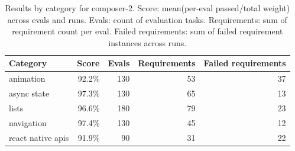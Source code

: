 \begin{table}[htbp]
\centering
\begin{tabular}{lrrrr}
\toprule
Category & Score & Evals & Requirements & Failed requirements \\
\midrule
animation & 92.2\% & 130 & 53 & 37 \\
async state & 97.3\% & 130 & 65 & 13 \\
lists & 96.6\% & 180 & 79 & 23 \\
navigation & 97.4\% & 130 & 45 & 12 \\
react native apis & 91.9\% & 90 & 31 & 22 \\
\bottomrule
\end{tabular}
\caption{Results by category for composer-2. Score: mean(per-eval passed/total weight) across evals and runs. Evals: count of evaluation tasks. Requirements: sum of requirement count per eval. Failed requirements: sum of failed requirement instances across runs.}
\end{table}
